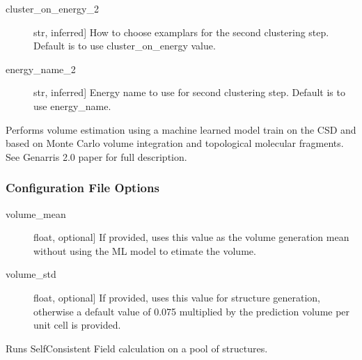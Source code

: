 \documentclass[letterpaper,10pt,english]{sphinxmanual}
\begin{document}
\begin{fulllineitems}
\begin{fulllineitems}
\begin{description}
\item[{cluster\_on\_energy\_2}] \leavevmode{[}str, inferred{]}
How to choose examplars for the second clustering step. Default
is to use cluster\_on\_energy value.

\item[{energy\_name\_2}] \leavevmode{[}str, inferred{]}
Energy name to use for second clustering step. Default is to use
energy\_name.

\end{description}

\end{fulllineitems}


\begin{fulllineitems}
\label{\detokenize{index:Genarris.genarris_master.Genarris.Estimate_Unit_Cell_Volume}}
Performs volume estimation using a machine learned model train on the
CSD and based on Monte Carlo volume integration and topological
molecular fragments. See Genarris 2.0 paper for full description.
\subsubsection*{Configuration File Options}
\begin{description}
\item[{volume\_mean}] \leavevmode{[}float, optional{]}
If provided, uses this value as the volume generation mean without
using the ML model to etimate the volume.

\item[{volume\_std}] \leavevmode{[}float, optional{]}
If provided, uses this value for structure generation, otherwise
a default value of 0.075 multiplied by the prediction volume per
unit cell is provided.

\end{description}

\end{fulllineitems}


\begin{fulllineitems}
\label{\detokenize{index:Genarris.genarris_master.Genarris.FHI_Aims_Energy_Evaluation}}
Runs Self\sphinxhyphen{}Consistent Field calculation on a pool of structures.

\end{fulllineitems}
\end{fulllineitems}
\end{document}
